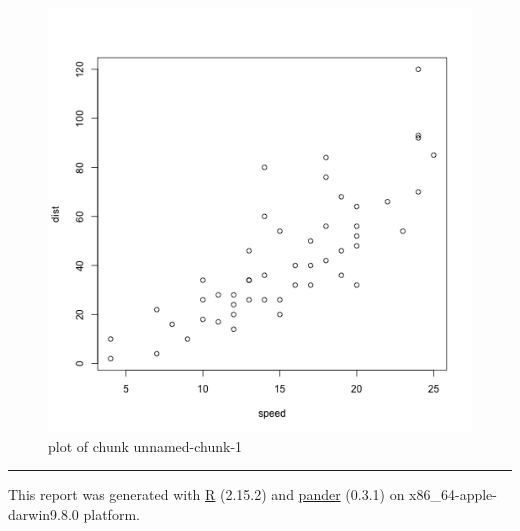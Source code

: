 \documentclass[]{article}
\makeatletter
\def\maxwidth{\ifdim\Gin@nat@width>\linewidth\linewidth
\else\Gin@nat@width\fi}
\let\Oldincludegraphics\includegraphics
\renewcommand{\includegraphics}[1]{\Oldincludegraphics[width=\maxwidth]{#1}}
\makeatother
\begin{document}
\begin{figure}[htbp]
\centering
\includegraphics{figure/unnamed-chunk-1.png}
\caption{plot of chunk unnamed-chunk-1}
\end{figure}

\begin{center}\rule{3in}{0.4pt}\end{center}

This report was generated with \href{http://www.r-project.org/}{R}
(2.15.2) and \href{https://github.com/rapporter/pander}{pander} (0.3.1)
on x86\_64-apple-darwin9.8.0 platform.
\end{document}
